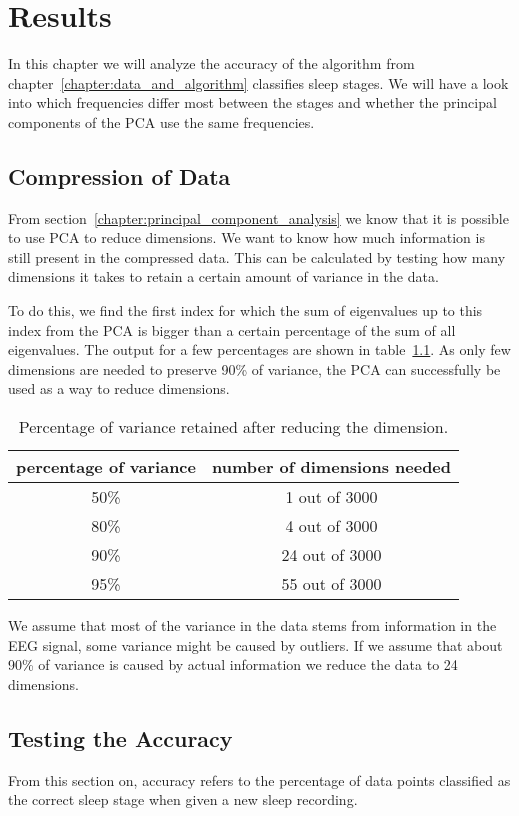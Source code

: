 \chapter{Results}
\label{chapter:results}

In this chapter we will analyze the accuracy of the algorithm from chapter~\ref{chapter:data_and_algorithm} classifies sleep stages. We will have a look into which frequencies differ most between the stages and whether the principal components of the PCA use the same frequencies.

\section{Compression of Data}
From section~\ref{chapter:principal_component_analysis} we know that it is possible to use PCA to reduce dimensions. We want to know how much information is still present in the compressed data. This can be calculated by testing how many dimensions it takes to retain a certain amount of variance in the data.

To do this, we find the first index for which the sum of eigenvalues up to this index from the PCA is bigger than a certain percentage of the sum of all eigenvalues. The output for a few percentages are shown in table~\ref{tab:explained_variance}. As only few dimensions are needed to preserve 90\% of variance, the PCA can successfully be used as a way to reduce dimensions.

\begin{table}
	\centering
	\begin{tabular}{c|c}
		percentage of variance & number of dimensions needed \\
		\hline
		50\% & 1 out of 3000 \\
		80\% & 4 out of 3000 \\
		90\% & 24 out of 3000 \\
		95\% & 55 out of 3000 \\
	\end{tabular}
	\caption{Percentage of variance retained after reducing the dimension.}
	\label{tab:explained_variance}
\end{table}

We assume that most of the variance in the data stems from information in the EEG signal, some variance might be caused by outliers. If we assume that about 90\% of variance is caused by actual information we reduce the data to 24 dimensions.

\section{Testing the Accuracy}
From this section on, accuracy refers to the percentage of data points classified as the correct sleep stage when given a new sleep recording.

